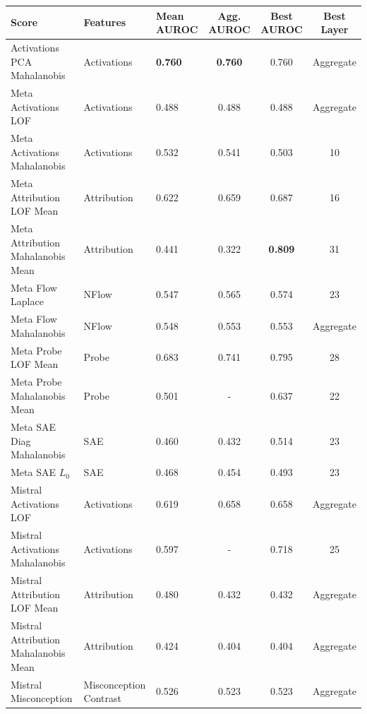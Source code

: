 \begin{table}[H]
\centering
\scriptsize  %
\renewcommand{\arraystretch}{1.2}  %
\setlength{\tabcolsep}{2pt}  %
\begin{tabular}{lp{3cm}lccc}
\toprule
\textbf{Score} & \textbf{Features} & \textbf{Mean AUROC} & \textbf{Agg. AUROC} & \textbf{Best AUROC} & \textbf{Best Layer} \\
\midrule
Activations PCA Mahalanobis          & Activations & \textbf{0.760}  & \textbf{0.760}  & 0.760  & Aggregate \\ 
Meta Activations LOF                 & Activations & 0.488  & 0.488  & 0.488  & Aggregate \\ 
Meta Activations Mahalanobis         & Activations & 0.532  & 0.541  & 0.503  & 10 \\ 
Meta Attribution LOF Mean            & Attribution & 0.622  & 0.659  & 0.687  & 16 \\ 
Meta Attribution Mahalanobis Mean    & Attribution & 0.441  & 0.322  & \textbf{0.809}  & 31 \\ 
Meta Flow Laplace                    & NFlow      & 0.547  & 0.565  & 0.574  & 23 \\ 
Meta Flow Mahalanobis                & NFlow      & 0.548  & 0.553  & 0.553  & Aggregate \\ 
Meta Probe LOF Mean                  & Probe      & 0.683  & 0.741  & 0.795  & 28 \\ 
Meta Probe Mahalanobis Mean          & Probe      & 0.501  & -      & 0.637  & 22 \\ 
Meta SAE Diag Mahalanobis            & SAE        & 0.460  & 0.432  & 0.514  & 23 \\ 
Meta SAE $L_0$                          & SAE        & 0.468  & 0.454  & 0.493  & 23 \\ 
Mistral Activations LOF              & Activations & 0.619  & 0.658  & 0.658  & Aggregate \\ 
Mistral Activations Mahalanobis      & Activations & 0.597  & -      & 0.718  & 25 \\ 
Mistral Attribution LOF Mean         & Attribution & 0.480  & 0.432  & 0.432  & Aggregate \\ 
Mistral Attribution Mahalanobis Mean & Attribution & 0.424  & 0.404  & 0.404  & Aggregate \\ 
Mistral Misconception                & Misconception Contrast & 0.526  & 0.523  & 0.523  & Aggregate \\ 

\end{tabular}
\end{table}
